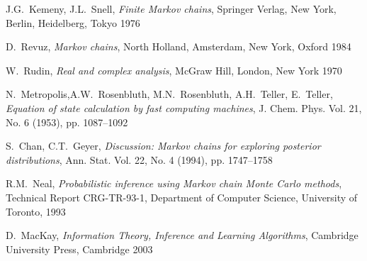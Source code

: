 \documentclass[a4paper, draft]{article}
\theoremstyle{own}
\theoremstyle{remark}
\begin{document}
\begin{thebibliography}{9}
J.G.~Kemeny, J.L.~Snell,
{\em Finite Markov chains},
Springer Verlag, New York, Berlin, Heidelberg, Tokyo 1976

D.~Revuz,
{\em Markov chains},
North Holland, Amsterdam, New York, Oxford 1984

W.~Rudin,
{\em Real and complex analysis},
McGraw Hill, London, New York 1970

N.~Metropolis,A.W.~Rosenbluth, M.N.~Rosenbluth, A.H.~Teller, E.~Teller,
{\em Equation of state calculation by fast computing machines},
J. Chem. Phys. Vol. 21, No. 6 (1953), pp. 1087--1092

S.~Chan, C.T.~Geyer,
{\em Discussion: Markov chains for exploring posterior distributions},
Ann. Stat. Vol. 22, No. 4 (1994), pp. 1747--1758


R.M.~Neal, 
{\em Probabilistic inference using Markov chain Monte Carlo methods}, 
Technical Report CRG-TR-93-1, Department of Computer Science, University of Toronto, 1993


D.~MacKay,
{\em Information Theory, Inference and Learning Algorithms},
Cambridge University Press, Cambridge 2003


\end{thebibliography}
\end{document}
